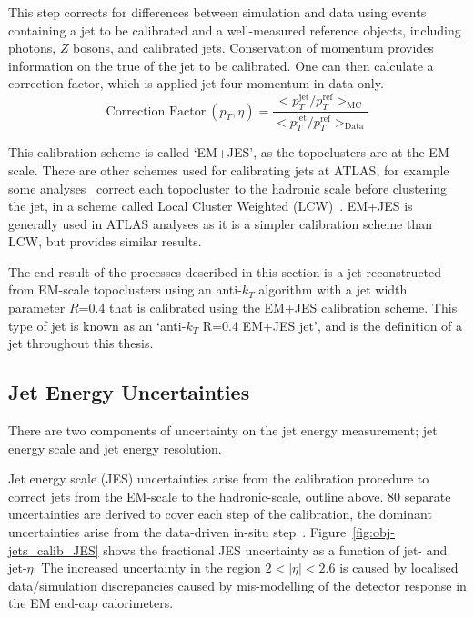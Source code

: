 \begin{enumerate}[leftmargin=*]
  This step corrects for differences between simulation and data using events
  containing a jet to be calibrated and a well-measured reference objects, including photons, $Z$ bosons, and calibrated jets.
  Conservation of momentum provides information on the true \pT{} of the jet to be calibrated.
  One can then calculate a correction factor, which is applied jet four-momentum in data only.
  \begin{equation}
    \text{Correction Factor}~(p_T, \eta) = \frac{ < p_T^{\text{jet}}/p_T^{\text{ref}}>_{\text{MC}} }{ < p_T^{\text{jet}}/p_T^{\text{ref}}>_{\text{Data}} }
  \end{equation}
\end{enumerate}

This calibration scheme is called `EM+JES', as the topoclusters are at the EM-scale.
There are other schemes used for calibrating jets at ATLAS,
for example some analyses~\cite{obj-VVjj} correct each topocluster to the hadronic scale
before clustering the jet, in a scheme called Local Cluster Weighted (LCW)~\cite{obj-jets_topo}.
EM+JES is generally used in ATLAS analyses as it is a simpler calibration scheme than LCW, but provides similar results.

The end result of the processes described in this section is a jet
reconstructed from EM-scale topoclusters using an anti-$k_T$ algorithm with a jet width parameter $R$=0.4
that is calibrated using the EM+JES calibration scheme.
This type of jet is known as an `anti-$k_T$ R=0.4 EM+JES jet',
and is the definition of a jet throughout this thesis.

\newpage

\subsection{Jet Energy Uncertainties}
\label{sec:obj-jets_uncert}

There are two components of uncertainty on the jet energy measurement; jet energy scale and jet energy resolution.

Jet energy scale (JES) uncertainties arise from the calibration procedure
to correct jets from the EM-scale to the hadronic-scale, outline above.
80 separate uncertainties are derived to cover each step of the calibration,
the dominant uncertainties arise from the data-driven in-situ step~\cite{obj-jets_calib_run2}.
Figure~\ref{fig:obj-jets_calib_JES} shows the fractional JES uncertainty as a function of jet-\pT{} and jet-$\eta$.
The increased uncertainty in the region $2 < |\eta| < 2.6$ is caused by localised data/simulation discrepancies
caused by mis-modelling of the detector response in the EM end-cap calorimeters.



